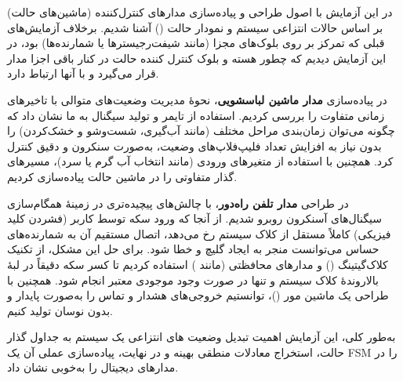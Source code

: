 \documentclass[12pt]{article}
\begin{document}
	در این آزمایش با اصول طراحی و پیاده‌سازی مدارهای کنترل‌کننده (ماشین‌های حالت) بر اساس حالات انتزاعی سیستم و نمودار حالت () آشنا شدیم. برخلاف آزمایش‌های قبلی که تمرکز بر روی بلوک‌های مجزا (مانند شیفت‌رجیسترها یا شمارنده‌ها) بود، در این آزمایش دیدیم که چطور هسته و بلوک کنترل کننده حالت در کنار باقی اجزا مدار قرار می‌گیرد و با آنها ارتباط دارد.
	
	در پیاده‌سازی \textbf{مدار ماشین لباسشویی}، نحوهٔ مدیریت وضعیت‌های متوالی با تاخیرهای زمانی متفاوت را بررسی کردیم. استفاده از تایمر  و تولید سیگنال  به ما نشان داد که چگونه می‌توان زمان‌بندی مراحل مختلف (مانند آب‌گیری، شست‌وشو و خشک‌کردن) را بدون نیاز به افزایش تعداد فلیپ‌فلاپ‌های وضعیت، به‌صورت سنکرون و دقیق کنترل کرد. همچنین با استفاده از متغیرهای ورودی (مانند انتخاب آب گرم یا سرد)، مسیرهای گذار متفاوتی را در ماشین حالت پیاده‌سازی کردیم.
	
	در طراحی \textbf{مدار تلفن راه‌دور}، با چالش‌های پیچیده‌تری در زمینهٔ همگام‌سازی سیگنال‌های آسنکرون روبرو شدیم. از آنجا که ورود سکه توسط کاربر (فشردن کلید فیزیکی) کاملاً مستقل از کلاک سیستم رخ می‌دهد، اتصال مستقیم آن به شمارنده‌های حساس می‌توانست منجر به ایجاد گلیچ و خطا شود. برای حل این مشکل، از تکنیک کلاک‌گیتینگ () و مدارهای محافظتی (مانند ) استفاده کردیم تا کسر سکه دقیقاً در لبهٔ بالاروندهٔ کلاک سیستم و تنها در صورت وجود موجودی معتبر انجام شود. همچنین با طراحی یک ماشین مور ()، توانستیم خروجی‌های هشدار و تماس را به‌صورت پایدار و بدون نوسان تولید کنیم.
	
	به‌طور کلی، این آزمایش اهمیت تبدیل وضعیت های انتزاعی یک سیستم به جداول گذار حالت، استخراج معادلات منطقی بهینه و در نهایت، پیاده‌سازی عملی آن یک FSM را در مدارهای دیجیتال را به‌خوبی نشان داد.
	
	
\end{document}
